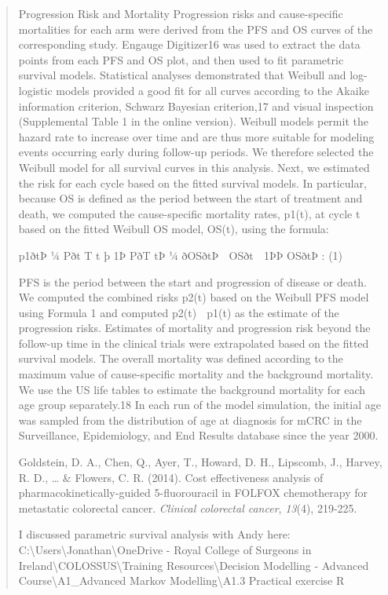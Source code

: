 \documentclass[
]{article}
\begin{document}
\begin{quote}
Progression Risk and Mortality Progression risks and cause-specific
mortalities for each arm were derived from the PFS and OS curves of the
corresponding study. Engauge Digitizer16 was used to extract the data
points from each PFS and OS plot, and then used to fit parametric
survival models. Statistical analyses demonstrated that Weibull and
log-logistic models provided a good fit for all curves according to the
Akaike information criterion, Schwarz Bayesian criterion,17 and visual
inspection (Supplemental Table 1 in the online version). Weibull models
permit the hazard rate to increase over time and are thus more suitable
for modeling events occurring early during follow-up periods. We
therefore selected the Weibull model for all survival curves in this
analysis. Next, we estimated the risk for each cycle based on the fitted
survival models. In particular, because OS is defined as the period
between the start of treatment and death, we computed the cause-specific
mortality rates, p1(t), at cycle t based on the fitted Weibull OS model,
OS(t), using the formula:

p1ðtÞ ¼ Pðt T t þ 1Þ PðT tÞ ¼ ðOSðtÞ  OSðt  1ÞÞ OSðtÞ : (1)

PFS is the period between the start and progression of disease or death.
We computed the combined risks p2(t) based on the Weibull PFS model
using Formula 1 and computed p2(t)  p1(t) as the estimate of the
progression risks. Estimates of mortality and progression risk beyond
the follow-up time in the clinical trials were extrapolated based on the
fitted survival models. The overall mortality was defined according to
the maximum value of cause-specific mortality and the background
mortality. We use the US life tables to estimate the background
mortality for each age group separately.18 In each run of the model
simulation, the initial age was sampled from the distribution of age at
diagnosis for mCRC in the Surveillance, Epidemiology, and End Results
database since the year 2000.

Goldstein, D. A., Chen, Q., Ayer, T., Howard, D. H., Lipscomb, J.,
Harvey, R. D., \ldots{} \& Flowers, C. R. (2014). Cost effectiveness
analysis of pharmacokinetically-guided 5-fluorouracil in FOLFOX
chemotherapy for metastatic colorectal cancer. \emph{Clinical colorectal
cancer}, \emph{13}(4), 219-225.

I discussed parametric survival analysis with Andy here:
C:\textbackslash Users\textbackslash Jonathan\textbackslash OneDrive -
Royal College of Surgeons in
Ireland\textbackslash COLOSSUS\textbackslash Training
Resources\textbackslash Decision Modelling - Advanced
Course\textbackslash A1\_Advanced Markov Modelling\textbackslash A1.3
Practical exercise R
\end{quote}
\end{document}

